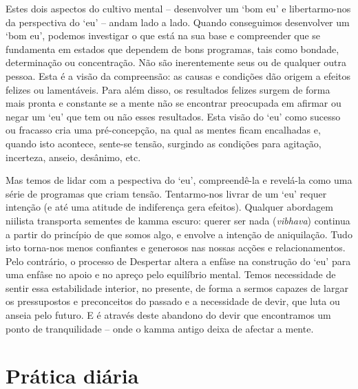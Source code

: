Estes dois aspectos do cultivo mental -- desenvolver um `bom eu' e
libertarmo-nos da perspectiva do `eu' -- andam lado a lado. Quando conseguimos
desenvolver um `bom eu', podemos investigar o que está na sua base e compreender
que se fundamenta em estados que dependem de bons programas, tais como bondade,
determinação ou concentração. Não são inerentemente seus ou de qualquer outra
pessoa. Esta é a visão da compreensão: as causas e condições dão origem a
efeitos felizes ou lamentáveis. Para além disso, os resultados felizes surgem de
forma mais pronta e constante se a mente não se encontrar preocupada em afirmar
ou negar um `eu' que tem ou não esses resultados. Esta visão do `eu' como
sucesso ou fracasso cria uma pré-concepção, na qual as mentes ficam encalhadas
e, quando isto acontece, sente-se tensão, surgindo as condições para agitação,
incerteza, anseio, desânimo, etc.

Mas temos de lidar com a pespectiva do `eu', compreendê-la e revelá-la como uma
série de programas que criam tensão. Tentarmo-nos livrar de um `eu' requer
intenção (e até uma atitude de indiferença gera efeitos). Qualquer abordagem
niilista transporta sementes de kamma escuro: querer ser nada (\emph{vibhava})
continua a partir do princípio de que somos algo, e envolve a intenção de
aniquilação. Tudo isto torna-nos menos confiantes e generosos nas nossas acções
e relacionamentos. Pelo contrário, o processo de Despertar altera a enfâse na
construção do `eu' para uma enfâse no apoio e no apreço pelo equilíbrio mental.
Temos necessidade de sentir essa estabilidade interior, no presente, de forma a
sermos capazes de largar os pressupostos e preconceitos do passado e a
necessidade de devir, que luta ou anseia pelo futuro. E é através deste abandono
do devir que encontramos um ponto de tranquilidade -- onde o kamma antigo deixa
de afectar a mente.

\section{Prática diária}

